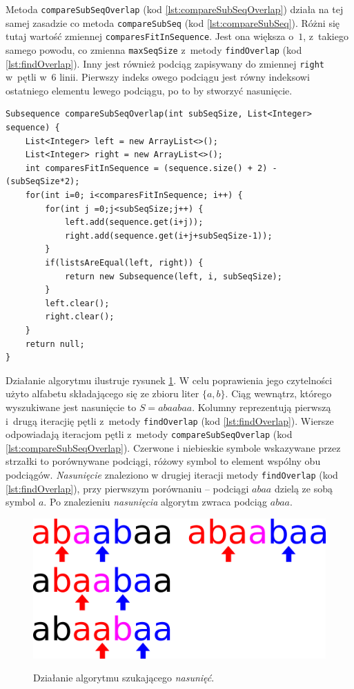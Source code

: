 \documentclass[document]{xmgr}
\begin{document}
Metoda \texttt{compareSubSeqOverlap} (kod \ref{lst:compareSubSeqOverlap}) działa na tej samej zasadzie co metoda \texttt{compareSubSeq} (kod \ref{lst:compareSubSeq}). Różni się tutaj wartość zmiennej \texttt{comparesFitInSequence}. Jest ona większa o~$1$, z~takiego samego powodu, co zmienna \texttt{max\-SeqSize} z~metody \texttt{findOverlap} (kod \ref{lst:findOverlap}). Inny jest również podciąg zapisywany do zmiennej \mbox{\texttt{right}} w~pętli w~6 linii. Pierwszy indeks owego podciągu jest równy indeksowi ostatniego elementu lewego podciągu, po to by stworzyć nasunięcie.
\newpage
\begin{lstlisting}[caption={Metoda pomocnicza przy szukaniu \emph{nasunięć} wewnątrz listy.},label=lst:compareSubSeqOverlap]
Subsequence compareSubSeqOverlap(int subSeqSize, List<Integer> sequence) {
	List<Integer> left = new ArrayList<>();
	List<Integer> right = new ArrayList<>();
	int comparesFitInSequence = (sequence.size() + 2) - (subSeqSize*2);
	for(int i=0; i<comparesFitInSequence; i++) {
		for(int j =0;j<subSeqSize;j++) {
			left.add(sequence.get(i+j));
			right.add(sequence.get(i+j+subSeqSize-1));
		}
		if(listsAreEqual(left, right)) {
			return new Subsequence(left, i, subSeqSize);
		}
		left.clear();
		right.clear();
	}
	return null;
} 
\end{lstlisting}

Działanie algorytmu ilustruje rysunek \ref{fig:overlapFinding}. W celu poprawienia jego czytelności użyto alfabetu składającego się ze zbioru liter $\{a, b\}$. Ciąg wewnątrz, którego wyszukiwane jest nasunięcie to $S=abaabaa$. Kolumny reprezentują pierwszą i~drugą iteracjię pętli z~metody \texttt{findOverlap} (kod \ref{lst:findOverlap}). Wiersze odpowiadają iteracjom pętli z~metody \texttt{compareSubSeqOverlap} (kod \ref{lst:compareSubSeqOverlap}). Czerwone i niebieskie symbole wskazywane przez strzałki to porównywane podciągi, różowy symbol to element wspólny obu podciągów. \emph{Nasunięcie} znaleziono w drugiej iteracji metody \texttt{findOverlap} (kod \ref{lst:findOverlap}), przy pierwszym porównaniu -- podciągi $abaa$ dzielą ze sobą symbol $a$. Po znalezieniu \emph{nasunięcia} algorytm zwraca podciąg $abaa$.

\begin{figure}[tbh]
    \centering
    \caption{Działanie algorytmu szukającego \emph{nasunięć}.}
    \includegraphics[width = \textwidth]{images/overlapFinding}
    \label{fig:overlapFinding}
\end{figure}
\end{document}
